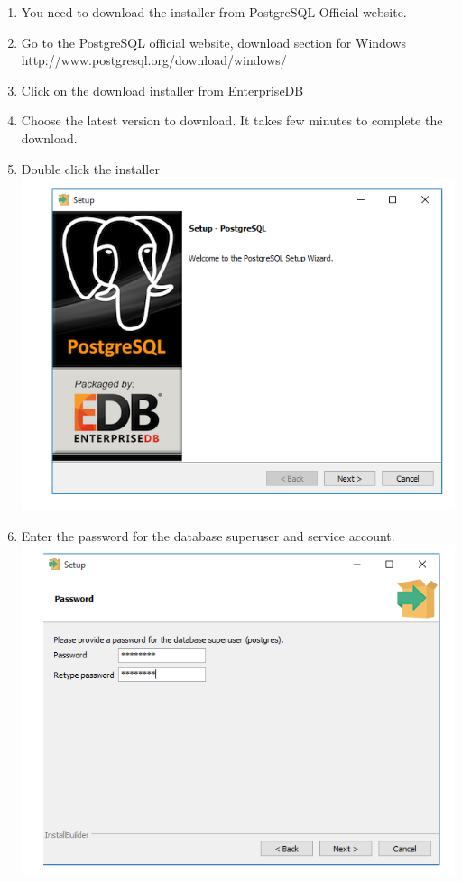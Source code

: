\documentclass[a4paper,12pt]{article}
\begin{document}
\begin{enumerate}
\item You need to download the installer from PostgreSQL Official website.
\item Go to the PostgreSQL official website, download section for Windows http://www.postgresql.org/download/windows/
\item Click on the download installer from EnterpriseDB
\item Choose the latest version to download. It takes few minutes to complete the download.
\item Double click the installer\\
\includegraphics[width=0.9\linewidth, center]{./Installation/postGresql1.PNG}\\[0.4cm]
\item Enter the password for the database superuser and service account. \\ 
\includegraphics[width=0.9\linewidth, center]{./Installation/postGresql2.PNG}\\[0.4cm]

\end{enumerate}
\end{document}
